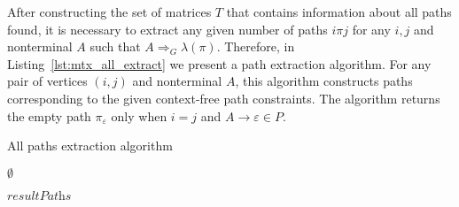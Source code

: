 After constructing the set of matrices $T$ that contains information about all paths found, it is necessary to extract any given number of paths $i \pi j$ for any $i, j$ and nonterminal $A$ such that $A \Rightarrow_G \lambda(\pi)$. Therefore, in Listing~\ref{lst:mtx_all_extract} we present a path extraction algorithm. For any pair of vertices $(i, j)$ and nonterminal $A$, this algorithm constructs paths corresponding to the given context-free path constraints. The algorithm returns the empty path $\pi_{\varepsilon}$ only when $i = j$ and $A \to \varepsilon \in P$.

\begin{algorithm}
	\begin{algorithmic}[1]
		\caption{All paths extraction algorithm}
		\label{lst:mtx_all_extract}		
		
		\State \Return $\emptyset$
		\EndIf
		
		
		  
		\EndIf
		\EndFor
		\EndIf
		\Else {}
		\EndIf
		\EndFor
		\EndIf
		\EndFor
		\State \Return $\textit{resultPaths}$
		\EndFunction
	\end{algorithmic}
\end{algorithm}

